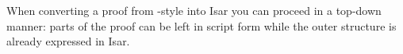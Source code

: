 \begin{isabellebody}
\begin{isamarkuptext}
When converting a proof from -style into Isar you can proceed
in a top-down manner: parts of the proof can be left in script form
while the outer structure is already expressed in Isar.%
\end{isamarkuptext}%
\isamarkuptrue%
%
\isadelimtheory
%
\endisadelimtheory
%
\isatagtheory
%
\endisatagtheory
{\isafoldtheory}%
%
\isadelimtheory
%
\endisadelimtheory
\end{isabellebody}%
